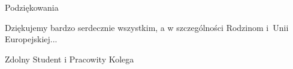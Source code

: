 \noindent
{\Large Podziękowania}
\bigskip

Dziękujemy bardzo serdecznie wszystkim, a w szczególności Rodzinom i~Unii Europejskiej...

\bigskip

{\raggedleft
Zdolny Student i Pracowity Kolega

}

